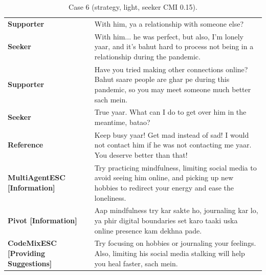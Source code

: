 \begin{table}[t]
\centering\footnotesize
\caption{Case 6 (strategy, light, seeker CMI 0.15).}
\label{tab:case6}
\begin{tabular}{@{}p{}p{}@{}}
\toprule
\textbf{Supporter} & With him, ya a relationship with someone else? \\
\textbf{Seeker} & With him... he was perfect, but also, I'm lonely yaar, and it's bahut hard to process not being in a relationship during the pandemic. \\
\textbf{Supporter} & Have you tried making other connections online? Bahut saare people are ghar pe during this pandemic, so you may meet someone much better sach mein. \\
\textbf{Seeker} & True yaar. What can I do to get over him in the meantime, batao? \\
\textbf{Reference} & Keep busy yaar! Get mad instead of sad! I would not contact him if he was not contacting me yaar. You deserve better than that! \\
\textbf{MultiAgentESC [Information]} & Try practicing mindfulness, limiting social media to avoid seeing him online, and picking up new hobbies to redirect your energy and ease the loneliness. \\
\textbf{Pivot [Information]} & Aap mindfulness try kar sakte ho, journaling kar lo, ya phir digital boundaries set karo taaki uska online presence kam dekhna pade. \\
\textbf{CodeMixESC [Providing Suggestions]} & Try focusing on hobbies or journaling your feelings. Also, limiting his social media stalking will help you heal faster, sach mein. \\
\bottomrule
\end{tabular}
\end{table}

